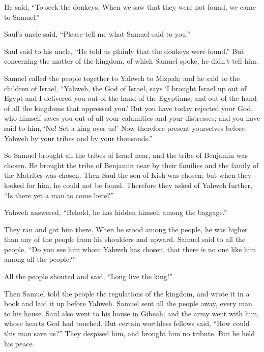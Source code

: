 {\par }{\PP He said, “To seek the donkeys. When we saw that they were not found, we came to Samuel.”
\par }{\PP {}Saul’s uncle said, “Please tell me what Samuel said to you.”
\par }{\PP {}Saul said to his uncle, “He told us plainly that the donkeys were found.” But concerning the matter of the kingdom, of which Samuel spoke, he didn’t tell him.
\par }{\PP {}Samuel called the people together to Yahweh to Mizpah;
and he said to the children of Israel, “Yahweh, the God of Israel, says ‘I brought Israel up out of Egypt and I delivered you out of the hand of the Egyptians, and out of the hand of all the kingdoms that oppressed you.’
But you have today rejected your God, who himself saves you out of all your calamities and your distresses; and you have said to him, ‘No! Set a king over us!’ Now therefore present yourselves before Yahweh by your tribes and by your thousands.”
\par }{\PP {}So Samuel brought all the tribes of Israel near, and the tribe of Benjamin was chosen.
He brought the tribe of Benjamin near by their families and the family of the Matrites was chosen. Then Saul the son of Kish was chosen; but when they looked for him, he could not be found.
Therefore they asked of Yahweh further, “Is there yet a man to come here?”
\par }{\PP Yahweh answered, “Behold, he has hidden himself among the baggage.”
\par }{\PP {}They ran and got him there. When he stood among the people, he was higher than any of the people from his shoulders and upward.
Samuel said to all the people, “Do you see him whom Yahweh has chosen, that there is no one like him among all the people?”
\par }{\PP All the people shouted and said, “Long live the king!”
\par }{\PP {}Then Samuel told the people the regulations of the kingdom, and wrote it in a book and laid it up before Yahweh. Samuel sent all the people away, every man to his house.
Saul also went to his house in Gibeah; and the army went with him, whose hearts God had touched.
But certain worthless fellows said, “How could this man save us?” They despised him, and brought him no tribute. But he held his peace.

}
